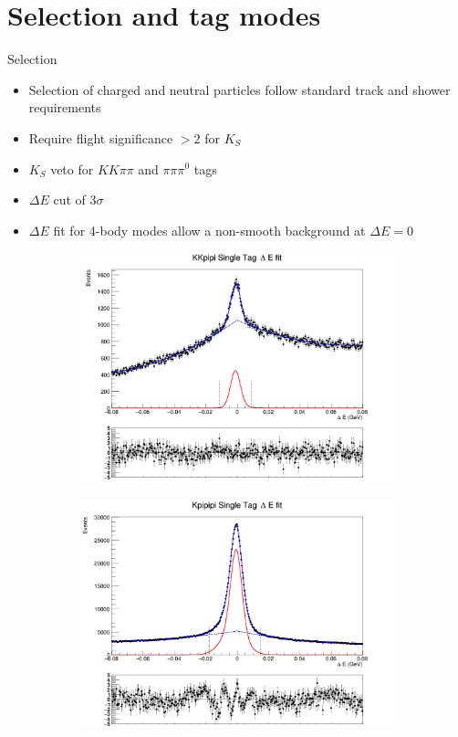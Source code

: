 \documentclass{beamer}
\begin{document}
\section{Selection and tag modes}
\begin{frame}{Selection}
  \begin{itemize}
    \item{Selection of charged and neutral particles follow standard track and shower requirements}
    \item{Require flight significance $> 2$ for $K_S$}
    \item{$K_S$ veto for $KK\pi\pi$ and $\pi\pi\pi^0$ tags}
    \item{$\Delta E$ cut of $3\sigma$}
    \item{$\Delta E$ fit for 4-body modes allow a non-smooth background at $\Delta E = 0$}
  \end{itemize}
  \begin{figure}
    \centering
    \begin{subfigure}{0.5\textwidth}
      \centering
      \includegraphics[width=\textwidth, clip = true, trim = {0 11cm 0 0 }]{Plots/KKpipi_SingleTag_DeltaE_Plot.png}
    \end{subfigure}%
    \begin{subfigure}{0.5\textwidth}
      \centering
      \includegraphics[width=\textwidth, clip = true, trim = {0 11cm 0 0 }]{Plots/Kpipipi_SingleTag_DeltaE_Plot.png}

\end{subfigure}
\end{figure}
\end{frame}
\end{document}
